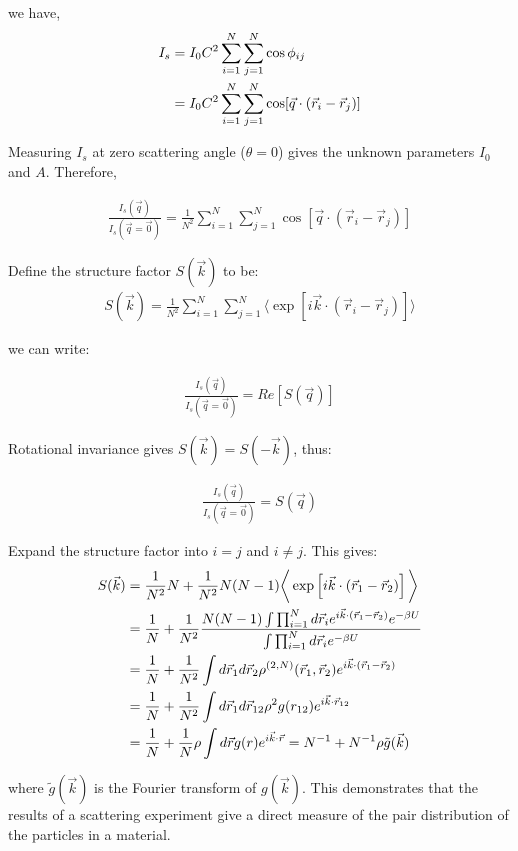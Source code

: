 \documentclass[book.tex]{subfiles}
\begin{document}
we have,
\begin{align}\label{Eq21}
I_s &= I_0C^2\sum_{i=1}^N\sum_{j=1}^N\cos\phi_{ij} \notag\\
 &= I_0C^2\sum_{i=1}^N\sum_{j=1}^N\cos[\vec{q}\cdot(\vec{r}_i - \vec{r}_j)]
\end{align}

Measuring $I_s$ at zero scattering angle ($\theta = 0$) gives the unknown parameters $I_0$ and $A$. Therefore,

\begin{align}
\frac{I_s(\vec{q})}{I_s(\vec{q}=\vec{0})} = \frac{1}{N^2}\sum_{i=1}^N\sum_{j=1}^N\cos[\vec{q}\cdot(\vec{r}_i - \vec{r}_j)]
\end{align}

Define the structure factor $S(\vec{k})$ to be:
\begin{align}
S(\vec{k}) = \frac{1}{N^2}\sum_{i=1}^N\sum_{j=1}^N \bigg\langle \exp\left[ i\vec{k}\cdot (\vec{r}_i - \vec{r}_j) \right] \bigg\rangle
\end{align}

we can write:

\begin{align}
\frac{I_s(\vec{q})}{I_s(\vec{q}=\vec{0})} = Re[S(\vec{q})]
\end{align}

Rotational invariance gives $S(\vec{k}) = S(-\vec{k})$, thus:

\begin{align}
\frac{I_s(\vec{q})}{I_s(\vec{q}=\vec{0})} = S(\vec{q})
\end{align} 

Expand the structure factor into $i = j$ and $i \neq j$. This gives:
\begin{align}
S(\vec{k}) & = \frac{1}{N^2}N + \frac{1}{N^2}N(N-1)\bigg\langle \exp\left[ i\vec{k}\cdot (\vec{r}_1 - \vec{r}_2) \right] \bigg\rangle \notag\\
& = \frac{1}{N} + \frac{1}{N^2}\frac{N(N-1)\int\prod_{i=1}^Nd\vec{r}_ie^{i\vec{k}\cdot (\vec{r}_1 - \vec{r}_2)}e^{-\beta U}}{\int\prod_{i=1}^Nd\vec{r}_ie^{-\beta U}}\notag\\
&= \frac{1}{N} + \frac{1}{N^2} \int d\vec{r}_1d\vec{r}_2\rho^{(2,N)}(\vec{r}_1,\vec{r}_2)e^{i\vec{k}\cdot (\vec{r}_1 - \vec{r}_2)} \notag\\
&= \frac{1}{N} + \frac{1}{N^2} \int d\vec{r}_1d\vec{r}_{12}\rho^2g(r_{12})e^{i\vec{k}\cdot\vec{r}_{12}} \notag\\
&= \frac{1}{N} + \frac{1}{N}\rho \int d\vec{r}g(r)e^{i\vec{k}\cdot\vec{r}} = N^{-1} + N^{-1}\rho\tilde{g}(\vec{k}) \notag
\end{align}

where $\tilde{g}(\vec{k})$ is the Fourier transform of $g(\vec{k})$. This demonstrates that the results of a scattering experiment give a direct measure of the pair distribution of the particles in a material.
\end{document}
